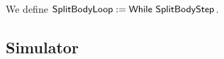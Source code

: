 \begin{definition}[$\MS{SplitBody}$]
  We define $\mathsf{SplitBodyLoop} := \mathsf{While}~\mathsf{SplitBodyStep}$.
\end{definition}



\subsection{Simulator}
\label{sec:HeapSim}


